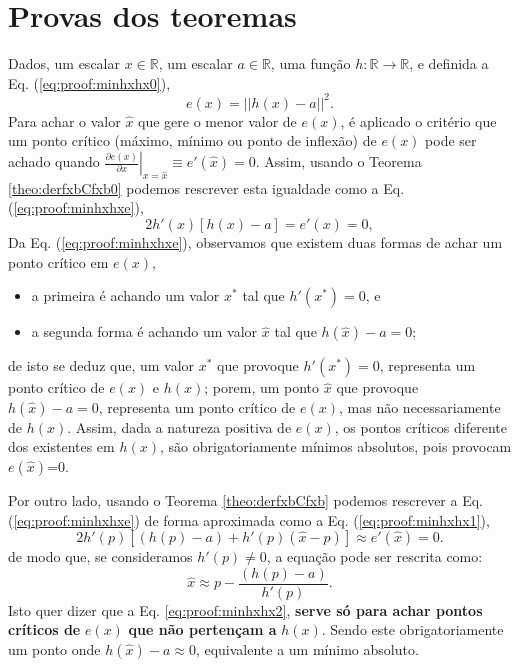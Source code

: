 \section{Provas dos teoremas}
 
\begin{myproofT}\label{proof:theo:minhxhx}
Dados,
um escalar $x \in \mathbb{R}$, 
um escalar $a \in \mathbb{R}$,  
uma função $h:\mathbb{R} \rightarrow \mathbb{R}$, e 
definida a Eq. (\ref{eq:proof:minhxhx0}),
\begin{equation}\label{eq:proof:minhxhx0}
e(x)=||h(x)-a||^2.
\end{equation}
Para achar o valor  $\hat{x}$ que gere o menor valor de $e(x)$, é aplicado
o critério que um ponto crítico (máximo, mínimo ou ponto de inflexão) de $e(x)$ pode ser achado quando 
$\left. \frac{\partial e(x)}{\partial x }\right|_{x=\hat{x}} \equiv e'(\hat{x}) =0$.
Assim, 
usando o Teorema \ref{theo:derfxbCfxb0} podemos 
rescrever esta igualdade como a Eq. (\ref{eq:proof:minhxhxe}),
\begin{equation}\label{eq:proof:minhxhxe}
2  h'(x) \left[h(x) -a\right] = e'(x)=0,
\end{equation}
Da Eq. (\ref{eq:proof:minhxhxe}), observamos 
que existem duas formas de achar um ponto crítico em $e(x)$,
\begin{itemize}
 \item a primeira é achando um valor $x^{*}$ tal que $h'(x^{*})=0$, e
 \item a segunda forma é achando um valor $\hat{x}$ tal que $h(\hat{x}) -a=0$;
\end{itemize}
de isto se deduz que, um valor $x^{*}$ que provoque $h'(x^{*})=0$, representa um ponto crítico de $e(x)$ e $h(x)$;
porem, um ponto $\hat{x}$ que provoque $h(\hat{x})-a=0$, representa um ponto crítico de $e(x)$, mas não
necessariamente de $h(x)$. Assim, dada a natureza positiva de $e(x)$, 
os pontos críticos diferente dos existentes em $h(x)$,
são obrigatoriamente mínimos absolutos, pois provocam $e(\hat{x})$=0.

Por outro lado, usando o Teorema \ref{theo:derfxbCfxb} podemos 
rescrever a Eq. (\ref{eq:proof:minhxhxe}) de forma aproximada como a Eq. (\ref{eq:proof:minhxhx1}),
\begin{equation}\label{eq:proof:minhxhx1}
2  h'(p) \left[\left(h(p)-a\right) + h'(p) \left(\hat{x} - p\right)\right] \approx
e'(\hat{x})=0.
\end{equation}
de modo que, se consideramos $h'(p)\neq 0$, a equação pode ser rescrita como:
\begin{equation}\label{eq:proof:minhxhx2}
\hat{x} \approx p - \frac{\left(h(p)-a\right)}{h'(p)}.
\end{equation}
Isto quer dizer que a Eq. \ref{eq:proof:minhxhx2}, \textbf{serve só para
achar pontos críticos de} $e(x)$ \textbf{que não pertençam a} $h(x)$.
Sendo este obrigatoriamente um ponto onde $h(\hat{x})-a\approx 0$, 
equivalente a um mínimo absoluto.


\end{myproofT}
